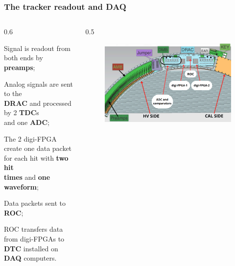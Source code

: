 \documentclass{beamer}
\begin{document}
\begin{frame}
    \frametitle{The tracker readout and DAQ}
    \vspace{-6mm}
    \begin{columns}
         \begin{column}{0.6\framewidth}
         \setlength{\leftmargini}{1em}
         \begin{itemize}
         {\small
         \item Signal is readout from both ends by  \textbf{preamps};
         \vspace{4mm}
         \item Analog signals are sent to the \\ \textbf{DRAC} and processed by 2 \textbf{TDC}s \\ and one \textbf{ADC};
         \vspace{4mm}
        \item The 2 digi-FPGA create one data packet for each hit with \textbf{two hit} \\ \textbf{times} and \textbf{one waveform};
        \vspace{4mm}
        \item Data packets sent to \textbf{ROC};
        \vspace{4mm}
        \item ROC transfers data from digi-FPGAs to \textbf{DTC} installed on \textbf{DAQ} computers.}
         \end{itemize}
    \end{column}
    \begin{column}{0.5\framewidth}
           \begin{figure}[h]
          \centering
                    \hspace*{-1.2em}
            \includegraphics[width=1.1\columnwidth]{figures/png/Screenshot_20240919_110354.png}

\end{figure}
\end{column}
\end{columns}
\end{frame}
\end{document}
